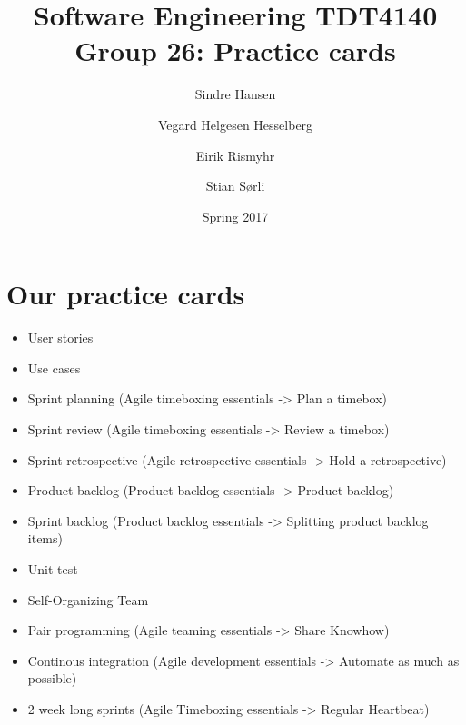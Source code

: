 \documentclass[12pt, a4paper]{article}
\title{\vspace{-6ex}Software Engineering TDT4140 \\ Group 26: Practice cards}
\author{Sindre Hansen \and Vegard Helgesen Hesselberg \and Eirik Rismyhr \and Stian Sørli}
\date{Spring 2017}
\begin{document}
\maketitle

\section{Our practice cards}
\begin{itemize}
    \item User stories
    \item Use cases
    \item Sprint planning (Agile timeboxing essentials -> Plan a timebox)
    \item Sprint review (Agile timeboxing essentials -> Review a timebox)
    \item Sprint retrospective (Agile retrospective essentials -> Hold a retrospective)
    \item Product backlog (Product backlog essentials -> Product backlog)
    \item Sprint backlog (Product backlog essentials -> Splitting product backlog items)
    \item Unit test
    \item Self-Organizing Team
    \item Pair programming (Agile teaming essentials -> Share Knowhow)
    \item Continous integration (Agile development essentials -> Automate as much as possible)
    \item 2 week long sprints (Agile Timeboxing essentials -> Regular Heartbeat)
    
\end{itemize}
\end{document}
